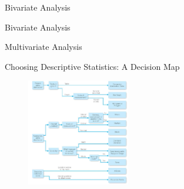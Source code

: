 \begin{frame}[t]{Bivariate Analysis}
\end{frame}





\begin{frame}[t]{Bivariate Analysis}
\end{frame}


\begin{frame}[t]{Multivariate Analysis}
\end{frame}



\begin{frame}[t]{Choosing Descriptive Statistics: A Decision Map }
	\begin{figure} [ht]
		\centering
		\includegraphics[width=0.4\textwidth]{eda/eda.png}
	\end{figure}
\end{frame}